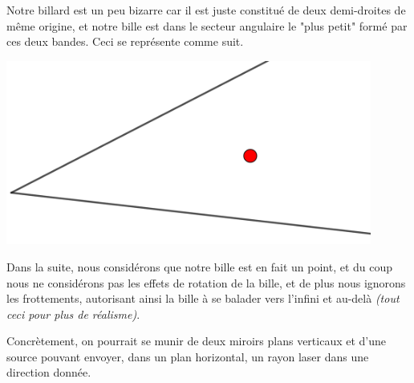 Notre billard est un peu bizarre car il est juste constitué de deux demi-droites de même origine, et notre bille est dans le secteur angulaire le "plus petit" formé par ces deux bandes. Ceci se représente comme suit.

\medskip

\begin{center}
	\includegraphics[width=12cm]{basic-math-pool/empty.png}
\end{center}

Dans la suite, nous considérons que notre bille est en fait un point, et du coup nous ne considérons pas les effets de rotation de la bille, et de plus nous ignorons les frottements, autorisant ainsi la bille à se balader vers l'infini et au-delà \emph{(tout ceci pour plus de réalisme)}.

\medskip

Concrètement, on pourrait se munir de deux miroirs plans verticaux et d'une source pouvant envoyer, dans un plan horizontal, un rayon laser dans une direction donnée.